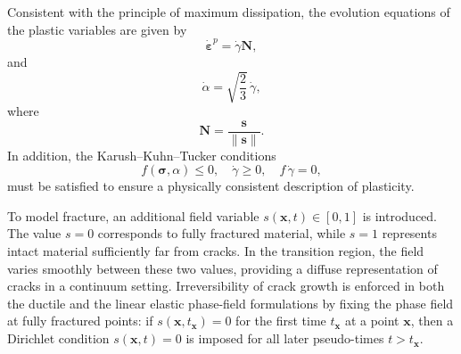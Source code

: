 \documentclass[pdflatex,sn-mathphys-num]{sn-jnl}%
\theoremstyle{thmstyleone}%
\theoremstyle{thmstyletwo}%
\theoremstyle{thmstylethree}%
\begin{document}
Consistent with the principle of maximum dissipation, the evolution equations of the plastic variables are given by
\begin{equation}
    \dot{\boldsymbol{\varepsilon}}^p = \dot{\gamma}\boldsymbol{N},
    \label{eq:evolution_eps_p}
\end{equation}
and
\begin{equation}
    \dot{\alpha} = \sqrt{\dfrac{2}{3}}\,\dot{\gamma},
    \label{eq:evolution_alpha}
\end{equation}
where
\begin{equation}
    \boldsymbol{N} = \dfrac{\boldsymbol{s}}{\|\boldsymbol{s}\|}.
\end{equation}
In addition, the Karush--Kuhn--Tucker conditions
\begin{equation}
    f(\boldsymbol{\sigma},\alpha) \le 0, 
    \quad \dot{\gamma} \ge 0, 
    \quad f\,\dot{\gamma} = 0,
\end{equation}
must be satisfied to ensure a physically consistent description of plasticity.

To model fracture, an additional field variable $s(\boldsymbol{x},t) \in [0,1]$ is introduced. 
The value $s=0$ corresponds to fully fractured material, while $s=1$ represents intact material sufficiently far from cracks. 
In the transition region, the field varies smoothly between these two values, providing a diffuse representation of cracks in a continuum setting.
Irreversibility of crack growth is enforced in both the ductile and the linear elastic phase-field formulations by fixing the phase field at fully fractured points: if $s(\boldsymbol{x},t_{\boldsymbol{x}})=0$ for the first time $t_{\boldsymbol{x}}$ at a point $\boldsymbol{x}$, then a Dirichlet condition $s(\boldsymbol{x},t)=0$ is imposed for all later pseudo-times $t>t_{\boldsymbol{x}}$.
\end{document}
